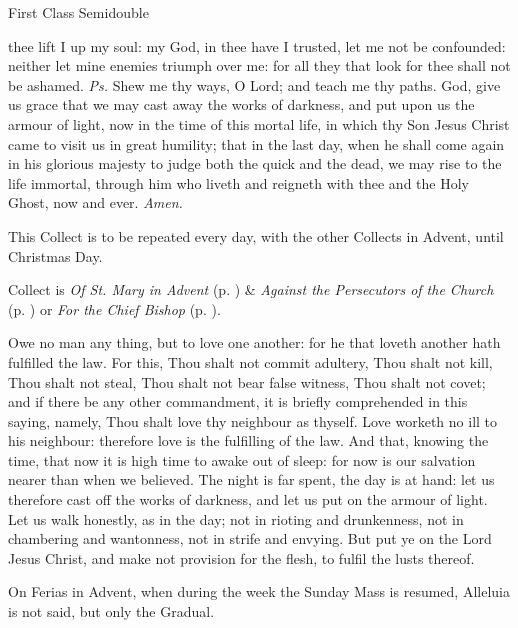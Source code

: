 	\fancyhead[RO,LE]{}
	\fancyhead[RE,LO]{}
	
{}

   \label{AdventI}
\begin{inhead}
    {First Class Semidouble}
\end{inhead}

\properantiphonfix

\introit
{} thee lift I up my soul: my God, in thee have I trusted, let me not be confounded: neither let mine enemies triumph over me: for all they that look for thee shall not be ashamed. \textit{Ps.} Shew me thy ways, O Lord; and teach me thy paths.
\collect\label{AdventICollect}
 God, give us grace that we may cast away the works of darkness, and put upon us the armour of light, now in the time of this mortal life, in which thy Son Jesus Christ came to visit us in great humility; that in the last day, when he shall come again in his glorious majesty to judge both the quick and the dead, we may rise to the life immortal, through him who liveth and reigneth with thee and the Holy Ghost, now and ever. \textit{Amen.}
\begin{rubric}
    This Collect is to be repeated every day, with the other Collects in Advent, until Christmas Day.
\end{rubric}
\begin{rubric}
     Collect is \emph{Of St. Mary in Advent} (p. \pageref{SPMaryInAdvent}) \&  \emph{Against the Persecutors of the Church} (p. \pageref{SPAgainst}) or \emph{For the Chief Bishop} (p. \pageref{SPChiefBishop}).
\end{rubric}
 Owe no man any thing, but to love one another: for he that loveth another hath fulfilled the law. For this, Thou shalt not commit adultery, Thou shalt not kill, Thou shalt not steal, Thou shalt not bear false witness, Thou shalt not covet; and if there be any other commandment, it is briefly comprehended in this saying, namely, Thou shalt love thy neighbour as thyself. Love worketh no ill to his neighbour: therefore love is the fulfilling of the law. And that, knowing the time, that now it is high time to awake out of sleep: for now is our salvation nearer than when we believed. The night is far spent, the day is at hand: let us therefore cast off the works of darkness, and let us put on the armour of light. Let us walk honestly, as in the day; not in rioting and drunkenness, not in chambering and wantonness, not in strife and envying. But put ye on the Lord Jesus Christ, and make not provision for the flesh, to fulfil the lusts thereof.
\begin{rubric}
    On Ferias in Advent, when during the week the Sunday Mass is resumed, Alleluia is not said, but only the Gradual.
\end{rubric}

